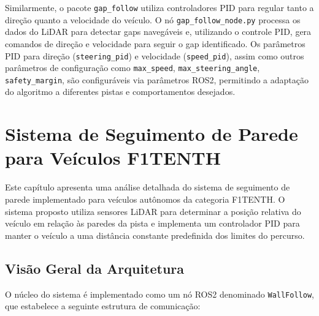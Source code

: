 Similarmente, o pacote \texttt{gap\_follow} utiliza controladores PID para
regular tanto a direção quanto a velocidade do veículo. O nó
\texttt{gap\_follow\_node.py} processa os dados do LiDAR para detectar gaps
navegáveis e, utilizando o controle PID, gera comandos de direção e velocidade
para seguir o gap identificado. Os parâmetros PID para direção
(\texttt{steering\_pid}) e velocidade (\texttt{speed\_pid}), assim como outros
parâmetros de configuração como \texttt{max\_speed},
\texttt{max\_steering\_angle}, \texttt{safety\_margin}, são configuráveis via
parâmetros ROS2, permitindo a adaptação do algoritmo a diferentes pistas e
comportamentos desejados.

\section{Sistema de Seguimento de Parede para Veículos F1TENTH}

Este capítulo apresenta uma análise detalhada do sistema de seguimento de
parede implementado para veículos autônomos da categoria F1TENTH. O sistema
proposto utiliza sensores LiDAR para determinar a posição relativa do veículo
em relação às paredes da pista e implementa um controlador PID para manter o
veículo a uma distância constante predefinida dos limites do percurso.

\subsection{Visão Geral da Arquitetura}

O núcleo do sistema é implementado como um nó ROS2 denominado
\texttt{WallFollow}, que estabelece a seguinte estrutura de comunicação:

